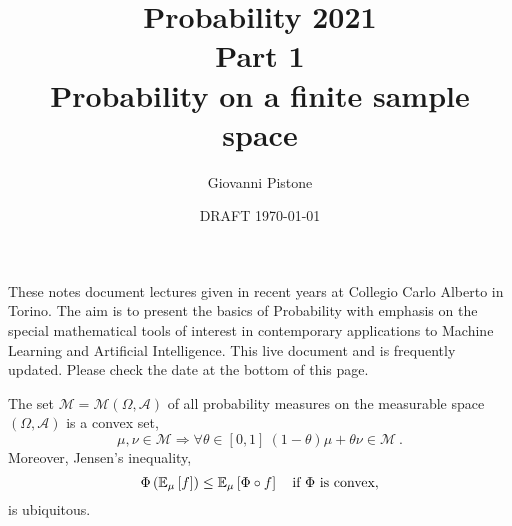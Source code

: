\documentclass[12pt,a4paper]{amsart}
\title{Probability 2021 \\ Part 1 \\
Probability on a finite sample space}
\author[G. Pistone]{Giovanni Pistone}
\date{DRAFT \today}
\theoremstyle{plain}%
\theoremstyle{definition}
\theoremstyle{remark}
\begin{document}
\maketitle

\begin{abstract}

\end{abstract}
These notes document lectures given in recent years at Collegio Carlo Alberto in Torino. The aim is to present the basics of Probability with emphasis on the special mathematical tools of interest in contemporary applications to Machine Learning and Artificial Intelligence. This live document and is frequently updated. Please check the date at the bottom of this page.

\tableofcontents

The set $\mathcal M=\mathcal M(\Omega,\mathcal A)$ of all probability measures on the measurable space $(\Omega,\mathcal A)$ is a convex set,
\begin{equation*}
    \mu,\nu \in \mathcal M \Rightarrow \forall \theta \in [0,1] \ (1-\theta) \mu + \theta \nu  \in \mathcal M \ .
\end{equation*}
Moreover, Jensen's inequality, 
\begin{equation*}
  \Phi\left(\operatorname{\mathbb E}_{\mu}\left[f\right]\right) \leq \operatorname{\mathbb E}_{\mu}\left[\Phi \circ f\right] \quad \text{if $\Phi$ is convex},  
\end{equation*}
is ubiquitous.
\end{document}
